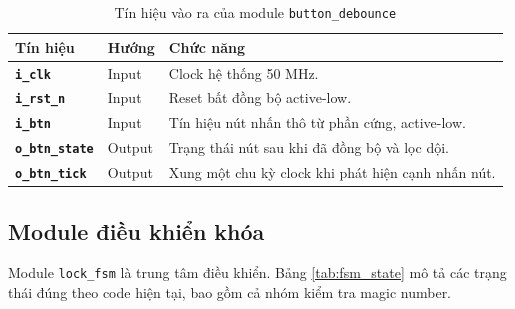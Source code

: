 \documentclass[13pt,a4paper]{article}
\begin{document}
\begin{table}[H]
\centering
\caption{Tín hiệu vào ra của module \texttt{button\_debounce}}
\label{tab:io_debounce}
\begin{tabularx}{\textwidth}{|>{\bfseries}p{3.4cm}|p{1.8cm}|X|}
\hline
\textbf{Tín hiệu} & \textbf{Hướng} & \textbf{Chức năng}\\
\hline
\texttt{i\_clk} & Input & Clock hệ thống 50 MHz.\\
\hline
\texttt{i\_rst\_n} & Input & Reset bất đồng bộ active-low.\\
\hline
\texttt{i\_btn} & Input & Tín hiệu nút nhấn thô từ phần cứng, active-low.\\
\hline
\texttt{o\_btn\_state} & Output & Trạng thái nút sau khi đã đồng bộ và lọc dội.\\
\hline
\texttt{o\_btn\_tick} & Output & Xung một chu kỳ clock khi phát hiện cạnh nhấn nút.\\
\hline
\end{tabularx}
\end{table}

\subsection{Module điều khiển khóa}
Module \texttt{lock\_fsm} là trung tâm điều khiển. Bảng \ref{tab:fsm_state} mô tả các trạng thái đúng theo code hiện tại, bao gồm cả nhóm kiểm tra magic number.
\end{document}
